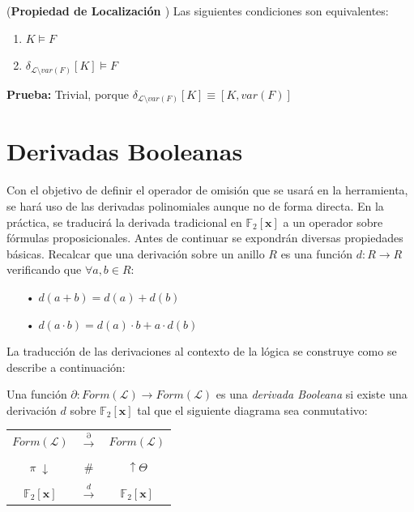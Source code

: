\cor (\textbf{Propiedad de Localización \cite{Borrego2009}}) Las siguientes condiciones son equivalentes:
\begin{enumerate}
\item $K \vDash F$
\item $\delta_{\mathcal{L} \setminus var(F)} [K] \vDash F$
\end{enumerate}

\noindent \textbf{Prueba:} Trivial, porque $\delta_{\mathcal{L} \setminus var(F)} [K] \equiv [K,var(F)]$

\section{Derivadas Booleanas}
Con el objetivo de definir el operador de omisión que se usará en la herramienta, se hará uso de las derivadas polinomiales aunque no de forma directa. En la práctica, se traducirá la derivada tradicional en $\mathbb{F}_2 [\textbf{x}]$ a un operador sobre fórmulas proposicionales. Antes de continuar se expondrán diversas propiedades básicas. Recalcar que una derivación sobre un anillo $R$ es una función $d:R \rightarrow R$ verificando que $\forall a,b \in R$:

\begin{itemize}
\item[•] $d(a+b) = d(a) + d(b)$
\item[•] $d(a \cdot b) = d(a) \cdot b + a \cdot d(b)$
\end{itemize}

La traducción de las derivaciones al contexto de la lógica se construye como se describe a continuación:

 \cite{Borrego2009} Una función $\partial : Form(\mathcal{L}) \rightarrow Form(\mathcal{L})$ es una \textit{derivada Booleana} si existe una derivación $d$ sobre $\mathbb{F}_2 [\textbf{x}]$ tal que el siguiente diagrama sea conmutativo:

\begin{table}[h]
\centering
\begin{tabular}{ccc}
 $Form(\mathcal{L})$& $\xrightarrow{\partial} $ & $Form(\mathcal{L})$ \\ \\
 $\pi \; \downarrow $ & $\#$ & $\uparrow \Theta$ \\\\
 $\mathbb{F}_2 [\textbf{x}]$ & $\xrightarrow{d}$ & $\mathbb{F}_2 [\textbf{x}]$
\end{tabular}
\end{table}
 
